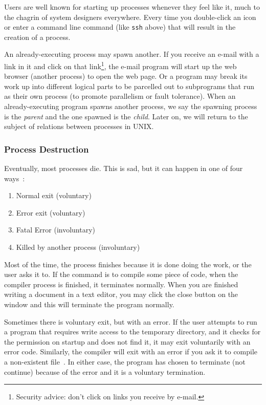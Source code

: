 Users are well known for starting up processes whenever they feel like it, much to the chagrin of system designers everywhere. Every time you double-click an icon or enter a command line command (like \texttt{ssh} above) that will result in the creation of a process.

An already-executing process may spawn another. If you receive an e-mail with a link in it and click on that link\footnote{Security advice: don't click on links you receive by e-mail.}, the e-mail program will start up the web browser (another process) to open the web page. Or a program may break its work up into different logical parts to be parcelled out to subprograms that run as their own process (to promote parallelism or fault tolerance). When an already-executing program spawns another process, we say the spawning process is the \textit{parent} and the one spawned is the \textit{child}. Later on, we will return to the subject of relations between processes in UNIX.

\subsubsection*{Process Destruction}

Eventually, most processes die. This is sad, but it can happen in one of four ways~\cite{mos}:
\begin{enumerate}
	\item Normal exit (voluntary)
	\item Error exit (voluntary)
	\item Fatal Error (involuntary)
	\item Killed by another process (involuntary)
\end{enumerate}

Most of the time, the process finishes because it is done doing the work, or the user asks it to. If the command is to compile some piece of code, when the compiler process is finished, it terminates normally. When you are finished writing a document in a text editor, you may click the close button on the window and this will terminate the program normally.

Sometimes there is voluntary exit, but with an error. If the user attempts to run a program that requires write access to the temporary directory, and it checks for the permission on startup and does not find it, it may exit voluntarily with an error code. Similarly, the compiler will exit with an error if you ask it to compile a non-existent file~\cite{mos}. In either case, the program has chosen to terminate (not continue) because of the error and it is a voluntary termination.

